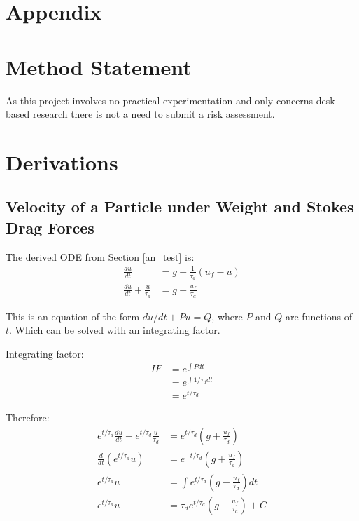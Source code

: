 \documentclass[../Interim_Report_Master]{subfiles}
\begin{document}
\hypertarget{apend}{\section*{Appendix}\label{apend}}
\appendix
\section{Method Statement}
As this project involves no practical experimentation and only concerns desk-based research there is not a need to submit a risk assessment.
\section{Derivations}
\subsection{Velocity of a Particle under Weight and Stokes Drag Forces}\label{particle_grav_drag_dev}
The derived ODE from Section \ref{an_test} is:
\begin{subequations}
	\begin{align}
	\frac{du}{dt} &= g + \frac{1}{\tau_d}(u_f-u) \\
	\frac{du}{dt} + \frac{u}{\tau_d} &= g + \frac{u_f}{\tau_d}
	\end{align}
\end{subequations}

This is an equation of the form $du/dt + Pu = Q$, where $P$ and $Q$ are functions of $t$. Which can be solved with an integrating factor.

Integrating factor:
\begin{subequations}
	\begin{align}
	IF &= e^{\int P dt} \\
	&= e^{\int 1/\tau_d dt} \\
	&= e^{t/\tau_d}
	\end{align}
\end{subequations}

Therefore:
\begin{subequations}
	\begin{align}
	e^{t/\tau_d}\frac{du}{dt} + e^{t/\tau_d}\frac{u}{\tau_d} &= e^{t/\tau_d}\left(g + \frac{u_f}{\tau_d}\right) \\
	\frac{d}{dt}\left(e^{t/\tau_d}u\right) &= e^{-t/\tau_d}\left(g + \frac{u_f}{\tau_d}\right) \\
	e^{t/\tau_d}u &= \int e^{t/\tau_d}\left(g - \frac{u_f}{\tau_d}\right) dt \\
	e^{t/\tau_d}u &= \tau_de^{t/\tau_d}\left(g + \frac{u_f}{\tau_d}\right) + C 
	\end{align}
\end{subequations}
\end{document}
